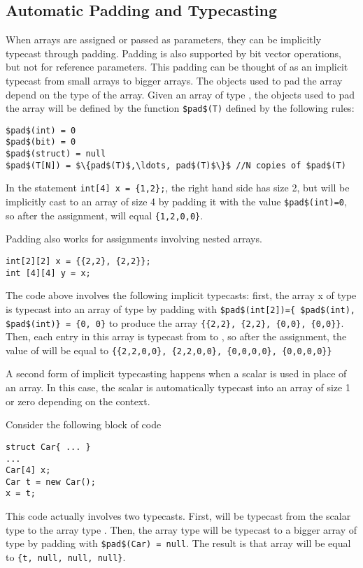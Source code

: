 \subsection{Automatic Padding and Typecasting}
When arrays are assigned or passed as parameters, they can be implicitly typecast through padding. Padding is also supported by bit vector operations, but not for reference parameters. This padding can be thought of as an implicit typecast from small arrays to bigger arrays. The objects used to pad the array depend on the type of the array. Given an array of type , the objects used to pad the array will be defined by the function \lstinline!$pad$(T)! defined by the following rules:
\begin{lstlisting}
$pad$(int) = 0 
$pad$(bit) = 0
$pad$(struct) = null
$pad$(T[N]) = $\{pad$(T)$,\ldots, pad$(T)$\}$ //N copies of $pad$(T)
\end{lstlisting}

\begin{Example}
In the statement \lstinline!int[4] x = {1,2};!, the right hand side has size 2, but will be implicitly cast to an array of size 4 by padding it with the value \lstinline!$pad$(int)=0!, so after the assignment,  will equal \lstinline!{1,2,0,0}!.
\end{Example}


\begin{Example}
Padding also works for assignments involving nested arrays.
\begin{lstlisting}
int[2][2] x = {{2,2}, {2,2}};
int [4][4] y = x;
\end{lstlisting}

The code above involves the following implicit typecasts: first, the array x of type  is typecast into an array of type  by padding with \lstinline!$pad$(int[2])={ $pad$(int), $pad$(int)} = {0, 0}! to produce the array \lstinline!{{2,2}, {2,2}, {0,0}, {0,0}}!. Then, each entry in this array is typecast from  to , so after the assignment, the value of  will be equal to \lstinline!{{2,2,0,0}, {2,2,0,0}, {0,0,0,0}, {0,0,0,0}}!
\end{Example}


A second form of implicit typecasting happens when a scalar is used in place of an array. In this case, the scalar is automatically typecast into an array of size 1 or zero depending on the context.

\begin{Example}
Consider the following block of code 
\begin{lstlisting}
struct Car{ ... }
...
Car[4] x;
Car t = new Car();
x = t;
\end{lstlisting}
This code actually involves two typecasts. First,  will be typecast from the scalar type  to the array type . Then, the array type  will be typecast to a bigger array of type  by padding with \lstinline!$pad$(Car) = null!. The result is that array will be equal to \lstinline!{t, null, null, null}!.
\end{Example}

